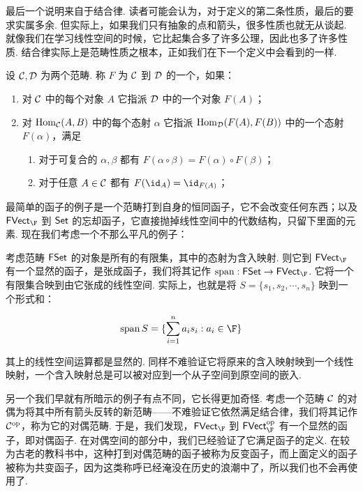 最后一个说明来自于结合律. 读者可能会认为，对于定义的第二条性质，最后的要求实属多余. 但实际上，如果我们只有抽象的点和箭头，很多性质也就无从谈起. 就像我们在学习线性空间的时候，它比起集合多了许多公理，因此也多了许多性质. 结合律实际上是范畴性质之根本，正如我们在下一个定义中会看到的一样.

\begin{definition}{}{}
    设 $\mathcal{C}, \mathcal{D}$ 为两个范畴. 称 $F$ 为 $\mathcal{C}$ 到 $\mathcal{D}$ 的一个，如果：
    \begin{enumerate}
        \item 对 $\mathcal{C}$ 中的每个对象 $A$ 它指派 $\mathcal{D}$ 中的一个对象 $F(A)$；
        \item 对 $\mathop\mathrm{Hom}_{\mathcal{C}} (A, B)$ 中的每个态射 $\alpha$ 它指派 $\mathop\mathrm{Hom}_{\mathcal{D}} (F(A), F(B))$ 中的一个态射 $F(\alpha)$，满足
        \begin{enumerate}
            \item 对于可复合的 $\alpha, \beta$ 都有 $F(\alpha \circ \beta) = F(\alpha) \circ F(\beta)$；
            \item 对于任意 $A \in \mathcal{C}$ 都有 $F(\id_A) = \id_{F(A)}$；
        \end{enumerate}
    \end{enumerate}
\end{definition}

最简单的函子的例子是一个范畴打到自身的恒同函子，它不会改变任何东西；以及 $\FVect_\F$ 到 $\mathsf{Set}$ 的忘却函子，它直接抛掉线性空间中的代数结构，只留下里面的元素. 现在我们考虑一个不那么平凡的例子：

\begin{example}{}{}
    考虑范畴 $\mathsf{FSet}$ 的对象是所有的有限集，其中的态射为含入映射. 则它到 $\FVect_\F$ 有一个显然的函子，是张成函子，我们将其记作 $\mathop{\mathrm{span}}: \FSet \to \FVect_\F$. 它将一个有限集合映到由它张成的线性空间. 实际上，也就是将 $S = \{s_1, s_2, \cdots, s_n\}$ 映到一个形式和：

    \[
        \mathop{\mathrm{span}} S = \{\sum_{i = 1}^n a_i s_i: a_i \in \F\}
    \]

    其上的线性空间运算都是显然的. 同样不难验证它将原来的含入映射映到一个线性映射，一个含入映射总是可以被对应到一个从子空间到原空间的嵌入.
\end{example}

另一个我们早就有所暗示的例子有点不同，它长得更加奇怪. 考虑一个范畴 $\mathcal{C}$ 的对偶为将其中所有箭头反转的新范畴——不难验证它依然满足结合律，我们将其记作 $\mathcal{C}^\mathrm{op}$，称为它的对偶范畴. 于是，我们发现，$\FVect_\F$ 到 $\FVect_\F^\mathrm{op}$ 有一个显然的函子，即对偶函子. 在对偶空间的部分中，我们已经验证了它满足函子的定义. 在较为古老的教科书中，这种打到对偶范畴的函子被称为反变函子，而上面定义的函子被称为共变函子，因为这类称呼已经淹没在历史的浪潮中了，所以我们也不会再使用了.

